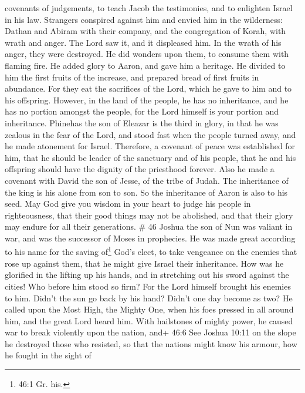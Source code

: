 covenants of judgements, to teach Jacob the testimonies, and to
enlighten Israel in his law.  Strangers conspired against
him and envied him in the wilderness: Dathan and Abiram with their
company, and the congregation of Korah, with wrath and anger.
 The Lord saw it, and it displeased him. In the wrath of
his anger, they were destroyed. He did wonders upon them, to consume
them with flaming fire.  He added glory to Aaron, and gave
him a heritage. He divided to him the first fruits of the increase, and
prepared bread of first fruits in abundance.  For they eat
the sacrifices of the Lord, which he gave to him and to his offspring.
 However, in the land of the people, he has no inheritance,
and he has no portion amongst the people, for the Lord himself is your
portion and inheritance.  Phinehas the son of Eleazar is
the third in glory, in that he was zealous in the fear of the Lord, and
stood fast when the people turned away, and he made atonement for
Israel.  Therefore, a covenant of peace was established for
him, that he should be leader of the sanctuary and of his people, that
he and his offspring should have the dignity of the priesthood forever.
 Also he made a covenant with David the son of Jesse, of
the tribe of Judah. The inheritance of the king is his alone from son to
son. So the inheritance of Aaron is also to his seed.  May
God give you wisdom in your heart to judge his people in righteousness,
that their good things may not be abolished, and that their glory may
endure for all their generations. \# 46  Joshua the son of
Nun was valiant in war, and was the successor of Moses in prophecies. He
was made great according to his name for the saving of\footnote{46:1 Gr.
  his.} God's elect, to take vengeance on the enemies that rose up
against them, that he might give Israel their inheritance. 
How was he glorified in the lifting up his hands, and in stretching out
his sword against the cities!  Who before him stood so firm?
For the Lord himself brought his enemies to him.  Didn't the
sun go back by his hand? Didn't one day become as two?  He
called upon the Most High, the Mighty One, when his foes pressed in all
around him, and the great Lord heard him.  With hailstones
of mighty power, he caused war to break violently upon the nation, and+
46:6 See Joshua 10:11 on the slope he destroyed those who resisted, so
that the nations might know his armour, how he fought in the sight of
